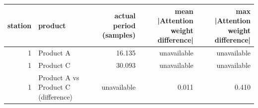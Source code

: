 \begin{tabular}{rlrrr}
\toprule
station & product & actual period (samples) & mean |Attention weight difference| & max |Attention weight difference| \\
\midrule
1 & Product A & 16.135 & unavailable & unavailable \\
1 & Product C & 30.093 & unavailable & unavailable \\
1 & Product A vs Product C (difference) & unavailable & 0.011 & 0.410 \\
\bottomrule
\end{tabular}
